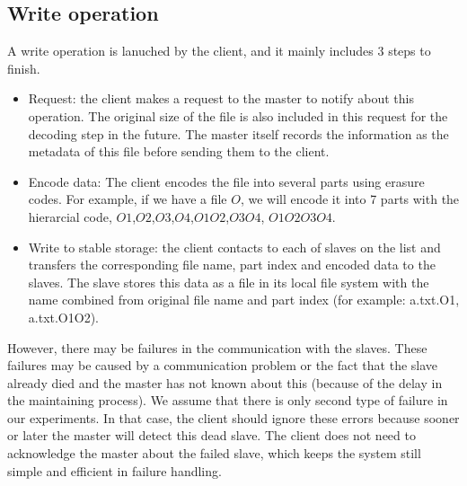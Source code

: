 \documentclass[conference]{IEEEtran}
\begin{document}
\subsection{Write operation}
A write operation is lanuched by the client, and it mainly includes 3 steps to finish.
\begin{itemize}
\item Request: the client makes a request to the master to notify about this operation. The original size of the file is also included in this request for the decoding step in the future. The master itself records the information as the  metadata  of this file before sending them to the client.
\item Encode data: The client encodes the file into several parts using erasure codes. For example, if we have a file $O$, we will encode it into 7 parts with the hierarcial code, $O1$,$O2$,$O3$,$O4$,$O1O2$,$O3O4$, $O1O2O3O4$.
\item  Write to stable storage: the client contacts to each of slaves on the list and transfers the corresponding file name, part index and encoded data to the slaves. The slave stores this data as a file in its local file system with the name combined from original file name and part index (for example: a.txt.O1, a.txt.O1O2). 
\end{itemize}

However, there may be failures in the communication with the slaves. These failures may be caused by a communication problem or the fact that the slave already died and the master has not known about this (because of the delay in the maintaining process). We assume that there is only second type of failure in our experiments. In that case, the client should ignore these errors because sooner or later the master will detect this dead slave. The client does not need to acknowledge the master about the failed slave, which keeps the system still simple and efficient in failure handling.
\end{document}
